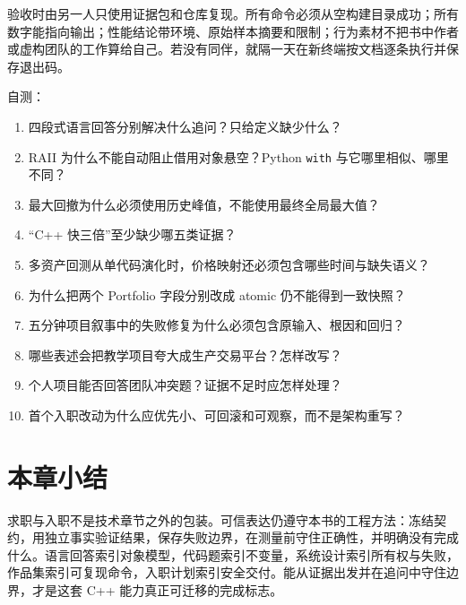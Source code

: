 验收时由另一人只使用证据包和仓库复现。所有命令必须从空构建目录成功；所有数字能指向输出；性能结论带环境、原始样本摘要和限制；行为素材不把书中作者或虚构团队的工作算给自己。若没有同伴，就隔一天在新终端按文档逐条执行并保存退出码。

自测：
\begin{enumerate}
  \item 四段式语言回答分别解决什么追问？只给定义缺少什么？
  \item RAII 为什么不能自动阻止借用对象悬空？Python \texttt{with} 与它哪里相似、哪里不同？
  \item 最大回撤为什么必须使用历史峰值，不能使用最终全局最大值？
  \item “C++ 快三倍”至少缺少哪五类证据？
  \item 多资产回测从单代码演化时，价格映射还必须包含哪些时间与缺失语义？
  \item 为什么把两个 Portfolio 字段分别改成 atomic 仍不能得到一致快照？
  \item 五分钟项目叙事中的失败修复为什么必须包含原输入、根因和回归？
  \item 哪些表述会把教学项目夸大成生产交易平台？怎样改写？
  \item 个人项目能否回答团队冲突题？证据不足时应怎样处理？
  \item 首个入职改动为什么应优先小、可回滚和可观察，而不是架构重写？
\end{enumerate}

\section{本章小结}

求职与入职不是技术章节之外的包装。可信表达仍遵守本书的工程方法：冻结契约，用独立事实验证结果，保存失败边界，在测量前守住正确性，并明确没有完成什么。语言回答索引对象模型，代码题索引不变量，系统设计索引所有权与失败，作品集索引可复现命令，入职计划索引安全交付。能从证据出发并在追问中守住边界，才是这套 C++ 能力真正可迁移的完成标志。
